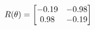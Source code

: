 \documentclass[preview]{standalone}
\begin{document}
\begin{align*}
\special{dvisvgm:raw <g id='unique000'>}R(\theta) = \begin{bmatrix}-0.19 & -0.98\\0.98 & -0.19\end{bmatrix}\special{dvisvgm:raw </g>}
\end{align*}
\end{document}

